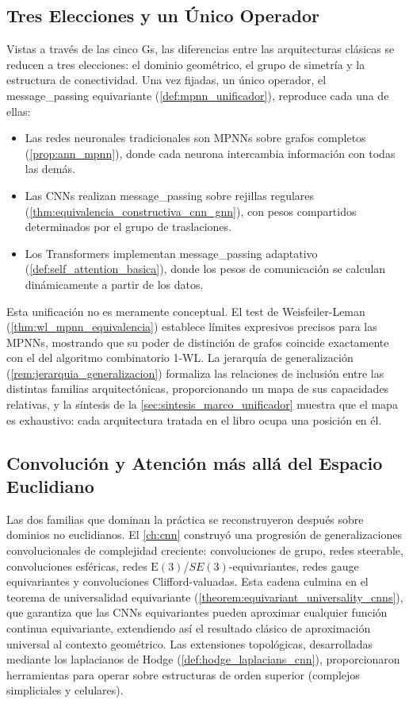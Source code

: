 \subsection{Tres Elecciones y un Único Operador}

Vistas a través de las cinco Gs, las diferencias entre las arquitecturas clásicas se reducen a tres elecciones: el dominio geométrico, el grupo de simetría y la estructura de conectividad. Una vez fijadas, un único operador, el \gls{message_passing} equivariante (\autoref{def:mpnn_unificador}), reproduce cada una de ellas:

\begin{itemize}
	\item Las redes neuronales tradicionales son \glspl{MPNN} sobre grafos completos (\autoref{prop:ann_mpnn}), donde cada neurona intercambia información con todas las demás.
	\item Las \glspl{CNN} realizan \gls{message_passing} sobre rejillas regulares (\autoref{thm:equivalencia_constructiva_cnn_gnn}), con pesos compartidos determinados por el grupo de traslaciones.
	\item Los \glspl{Transformer} implementan \gls{message_passing} adaptativo (\autoref{def:self_attention_basica}), donde los pesos de comunicación se calculan dinámicamente a partir de los datos.
\end{itemize}

Esta unificación no es meramente conceptual. El test de Weisfeiler-Leman (\autoref{thm:wl_mpnn_equivalencia}) establece límites expresivos precisos para las \glspl{MPNN}, mostrando que su poder de distinción de grafos coincide exactamente con el del algoritmo combinatorio 1-WL. La jerarquía de generalización (\autoref{rem:jerarquia_generalizacion}) formaliza las relaciones de inclusión entre las distintas familias arquitectónicas, proporcionando un mapa de sus capacidades relativas, y la síntesis de la \autoref{sec:sintesis_marco_unificador} muestra que el mapa es exhaustivo: cada arquitectura tratada en el libro ocupa una posición en él.

\subsection{Convolución y Atención más allá del Espacio Euclidiano}

Las dos familias que dominan la práctica se reconstruyeron después sobre dominios no euclidianos. El \autoref{ch:cnn} construyó una progresión de generalizaciones convolucionales de complejidad creciente: convoluciones de grupo, redes steerable, convoluciones esféricas, redes $\text{E}(3)$/$SE(3)$-equivariantes, redes gauge equivariantes y convoluciones Clifford-valuadas. Esta cadena culmina en el teorema de universalidad equivariante (\autoref{theorem:equivariant_universality_cnns}), que garantiza que las \glspl{CNN} equivariantes pueden aproximar cualquier función continua equivariante, extendiendo así el resultado clásico de aproximación universal al contexto geométrico. Las extensiones topológicas, desarrolladas mediante los laplacianos de Hodge (\autoref{def:hodge_laplacians_cnn}), proporcionaron herramientas para operar sobre estructuras de orden superior (complejos simpliciales y celulares).

